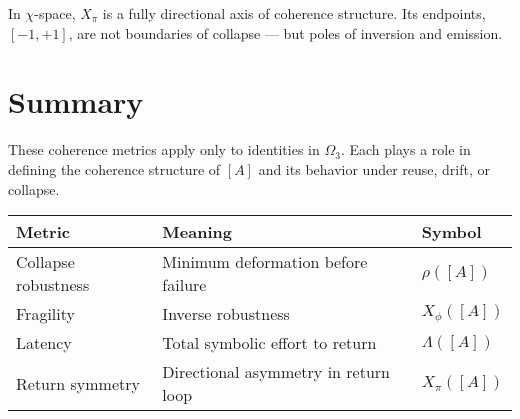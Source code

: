 In $\chi$-space, $X_\pi$ is a fully directional axis of coherence structure.  
Its endpoints, $[-1, +1]$, are not boundaries of collapse — but poles of inversion and emission.

\section{Summary}

These coherence metrics apply only to identities in $\Omega_3$.  
Each plays a role in defining the coherence structure of $[A]$ and its behavior under reuse, drift, or collapse.

\begin{center}
\begin{tabular}{>{\raggedright}p{4cm} >{\raggedright}p{6cm} >{\raggedright\arraybackslash}p{4cm}}
\toprule
\textbf{Metric} & \textbf{Meaning} & \textbf{Symbol} \\
\midrule
Collapse robustness & Minimum deformation before failure & $\rho([A])$ \\
Fragility & Inverse robustness & $X_\phi([A])$ \\
Latency & Total symbolic effort to return & $\Lambda([A])$ \\
Return symmetry & Directional asymmetry in return loop & $X_\pi([A])$ \\
\bottomrule
\end{tabular}
\end{center}
